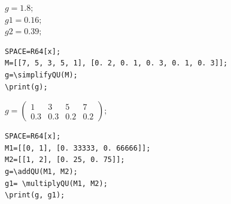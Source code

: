 {$g = 1. 8; $\\
\hspace*{4mm} $g1 = 0. 16; $\\
\hspace*{4mm} $g2 = 0. 39;$} 

\begin{verbatim}
SPACE=R64[x]; 
M=[[7, 5, 3, 5, 1], [0. 2, 0. 1, 0. 3, 0. 1, 0. 3]];
g=\simplifyQU(M); 
\print(g);
\end{verbatim}

{$g =\left(\begin{array}{cccc}1 &3 &5 &7 \\ 0. 3 &0. 3 &0. 2 &0. 2 \end{array}\right);$}

\begin{verbatim}
SPACE=R64[x]; 
M1=[[0, 1], [0. 33333, 0. 66666]]; 
M2=[[1, 2], [0. 25, 0. 75]];
g=\addQU(M1, M2); 
g1= \multiplyQU(M1, M2);  
\print(g, g1);
\end{verbatim}

